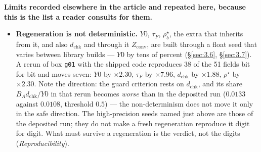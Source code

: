 \textbf{Limits recorded elsewhere in the article and repeated here, because this
is the list a reader consults for them.}

\begin{itemize}
\item \textbf{Regeneration is not deterministic.} $Y0$, $\tau_{F}$,
  $\rho^{\star}_{b}$, the $\mathrm{extra}$ that inherits from it, and also
  $d_{\mathrm{chk}}$ and through it $Z_{\mathrm{conv}}$, are built
  through a float seed that varies between library builds --- $Y0$ by tens of
  percent (\S\ref{sec:3.6}, \S\ref{sec:3.7}). A rerun of box \texttt{g01}
  with the shipped code reproduces 38 of the 51 fields bit for bit and moves
  seven: $Y0$ by $\times 2.30$, $\tau_{F}$ by $\times 7.96$,
  $d_{\mathrm{chk}}$ by $\times 1.88$, $\rho^{\star}$ by $\times 2.30$.
  Note the direction: the guard criterion rests on $d_{\mathrm{chk}}$, and its
  share $B_{A}d_{\mathrm{chk}}/Y0$ in that rerun becomes \emph{worse} than in
  the deposited run ($0.0133$ against $0.0108$, threshold $0.5$) --- the
  non-determinism does not move it only in the safe direction. The high-precision seeds named
  just above are those of the deposited run; they do not make a fresh
  regeneration reproduce it digit for digit. What must survive a regeneration is
  the verdict, not the digits (\emph{Reproducibility}).


\end{itemize}
